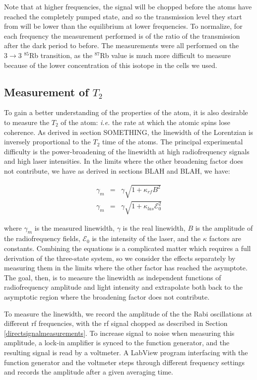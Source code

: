 Note that at higher frequencies, the signal will be chopped before the atoms have reached the completely pumped state, and so the transmission level they start from will be lower than the equilibrium at lower frequencies. To normalize, for each frequency the measurement performed is of the ratio of the transmission after the dark period to before. The measurements were all performed on the $3\rightarrow3$ $^{85}$Rb transition, as the $^{87}$Rb value is much more difficult to measure because of the lower concentration of this isotope in the cells we used.

\subsection{Measurement of $T_{2}$} \label{measurementoft2}

To gain a better understanding of the properties of the atom, it is also desirable to measure the $T_{2}$ of the atom: \emph{i.e.} the rate at which the atomic spins lose coherence. As derived in section SOMETHING, the linewidth of the Lorentzian is inversely proportional to the $T_{2}$ time of the atoms. The principal experimental difficulty is the power-broadening of the linewidth at high radiofrequency signals and high laser intensities. In the limits where the other broadening factor does not contribute, we have as derived in sections BLAH and BLAH, we have:

\begin{eqnarray}
\gamma_{m} &=& \gamma \sqrt{1+ \kappa_{rf} B^{2}} \label{eq:rfbroad}\\
\gamma_{m} &=&\gamma \sqrt{1+ \kappa_{las} \mathcal{E}_{0}^{2}} \label{eq:lightbroad}
\end{eqnarray}

where $\gamma_{m}$ is the measured linewidth, $\gamma$ is the real linewidth, $B$ is the amplitude of the radiofrequency fields, $\mathcal{E}_{0}$ is the intensity of the laser, and the $\kappa$ factors are constants. Combining the equations is a complicated matter which requires a full derivation of the three-state system, so we consider the effects separately by measuring them in the limits where the other factor has reached the asymptote. The goal, then, is to measure the linewidth as independent functions of radiofrequency amplitude and light intensity and extrapolate both back to the asymptotic region where the broadening factor does not contribute.

To measure the linewidth, we record the amplitude of the the Rabi oscillations at different rf frequencies, with the rf signal chopped as described in Section \ref{directsignalmeasurements}. To increase signal to noise when measuring this amplitude, a lock-in amplifier is synced to the function generator, and the resulting signal is read by a voltmeter. A LabView program interfacing with the function generator and the voltmeter steps through different frequency settings and records the amplitude after a given averaging time.

